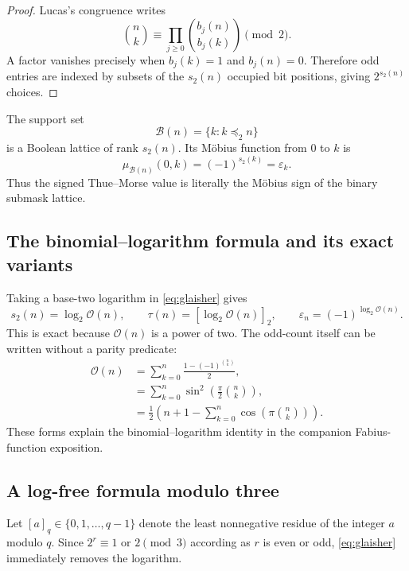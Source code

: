 \documentclass[11pt,oneside]{article}
\theoremstyle{definition}
\theoremstyle{remark}
\newcommand{\bitsum}{s_2}
\newcommand{\eps}{\varepsilon}
\newcommand{\res}[2]{\left[#1\right]_{#2}}
\newcommand{\submask}{\preccurlyeq_2}
\begin{document}
\begin{proof}
Lucas's congruence writes
\[
 \binom nk\equiv\prod_{j\ge0}\binom{b_j(n)}{b_j(k)}\pmod2.
\]
A factor vanishes precisely when $b_j(k)=1$ and $b_j(n)=0$.  Therefore odd
entries are indexed by subsets of the $\bitsum(n)$ occupied bit positions,
giving $2^{\bitsum(n)}$ choices.
\end{proof}

The support set
\begin{equation}\label{eq:pascal-support}
 \mathcal B(n)=\{k:k\submask n\}
\end{equation}
is a Boolean lattice of rank $\bitsum(n)$.  Its Möbius function from $0$ to
$k$ is
\begin{equation}\label{eq:boolean-mobius}
 \mu_{\mathcal B(n)}(0,k)=(-1)^{\bitsum(k)}=\eps_k.
\end{equation}
Thus the signed Thue--Morse value is literally the Möbius sign of the binary
submask lattice.

\subsection{The binomial--logarithm formula and its exact variants}

Taking a base-two logarithm in \cref{eq:glaisher} gives
\begin{equation}\label{eq:binomial-log}
 \bitsum(n)=\log_2\mathcal O(n),
 \qquad
 \tau(n)=\res{\log_2\mathcal O(n)}{2},
 \qquad
 \eps_n=(-1)^{\log_2\mathcal O(n)}.
\end{equation}
This is exact because $\mathcal O(n)$ is a power of two.  The odd-count itself
can be written without a parity predicate:
\begin{align}
 \mathcal O(n)
 &=\sum_{k=0}^n \frac{1-(-1)^{\binom nk}}2,\label{eq:odd-count-sign}\\
 &=\sum_{k=0}^n\sin^2\!\left(\frac\pi2\binom nk\right),\label{eq:odd-count-trig}\\
 &=\frac12\left(n+1-\sum_{k=0}^n\cos\!\left(\pi\binom nk\right)\right).
 \label{eq:odd-count-cos}
\end{align}
These forms explain the binomial--logarithm identity in the companion
Fabius-function exposition.

\subsection{A log-free formula modulo three}

Let $[a]_q\in\{0,1,\ldots,q-1\}$ denote the least nonnegative residue of the
integer $a$ modulo $q$.  Since $2^r\equiv1$ or $2\pmod3$ according as $r$ is
even or odd, \cref{eq:glaisher} immediately removes the logarithm.
\end{document}
